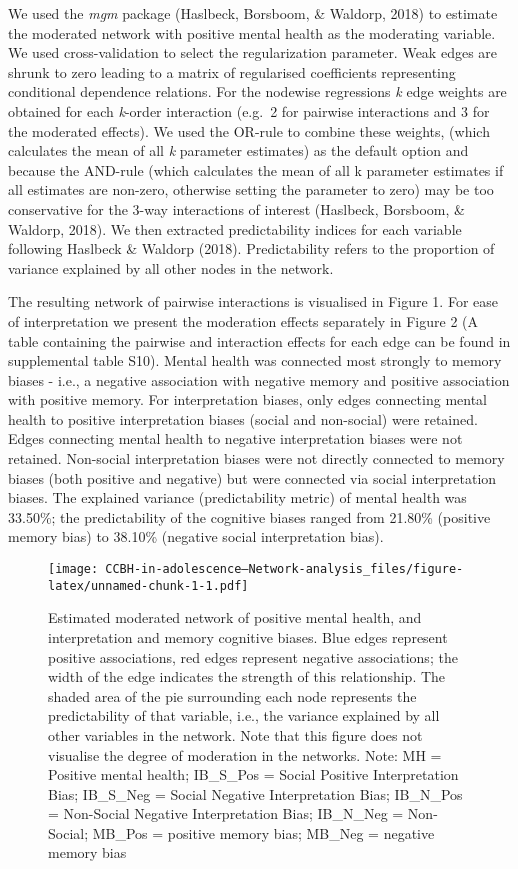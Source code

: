 \documentclass[
  english,
  man]{apa6}
\begin{document}
We used the \emph{mgm} package (Haslbeck, Borsboom, \& Waldorp, 2018) to estimate the moderated network with positive mental health as the moderating variable. We used cross-validation to select the regularization parameter. Weak edges are shrunk to zero leading to a matrix of regularised coefficients representing conditional dependence relations. For the nodewise regressions \emph{k} edge weights are obtained for each \emph{k}-order interaction (e.g.~2 for pairwise interactions and 3 for the moderated effects). We used the OR-rule to combine these weights, (which calculates the mean of all \emph{k} parameter estimates) as the default option and because the AND-rule (which calculates the mean of all k parameter estimates if all estimates are non-zero, otherwise setting the parameter to zero) may be too conservative for the 3-way interactions of interest (Haslbeck, Borsboom, \& Waldorp, 2018). We then extracted predictability indices for each variable following Haslbeck \& Waldorp (2018). Predictability refers to the proportion of variance explained by all other nodes in the network.

The resulting network of pairwise interactions is visualised in Figure 1. For ease of interpretation we present the moderation effects separately in Figure 2 (A table containing the pairwise and interaction effects for each edge can be found in supplemental table S10). Mental health was connected most strongly to memory biases - i.e., a negative association with negative memory and positive association with positive memory. For interpretation biases, only edges connecting mental health to positive interpretation biases (social and non-social) were retained. Edges connecting mental health to negative interpretation biases were not retained. Non-social interpretation biases were not directly connected to memory biases (both positive and negative) but were connected via social interpretation biases. The explained variance (predictability metric) of mental health was 33.50\%; the predictability of the cognitive biases ranged from 21.80\% (positive memory bias) to 38.10\% (negative social interpretation bias).

\begin{figure}
\centering
\texttt{[image: CCBH-in-adolescence---Network-analysis\_files/figure-latex/unnamed-chunk-1-1.pdf]}
\caption{\label{fig:unnamed-chunk-1}Estimated moderated network of positive mental health, and interpretation and memory cognitive biases. Blue edges represent positive associations, red edges represent negative associations; the width of the edge indicates the strength of this relationship. The shaded area of the pie surrounding each node represents the predictability of that variable, i.e., the variance explained by all other variables in the network. Note that this figure does not visualise the degree of moderation in the networks.
Note: MH = Positive mental health; IB\_S\_Pos = Social Positive Interpretation Bias; IB\_S\_Neg = Social Negative Interpretation Bias; IB\_N\_Pos = Non-Social Negative Interpretation Bias; IB\_N\_Neg = Non-Social; MB\_Pos = positive memory bias; MB\_Neg = negative memory bias}
\end{figure}
\end{document}
